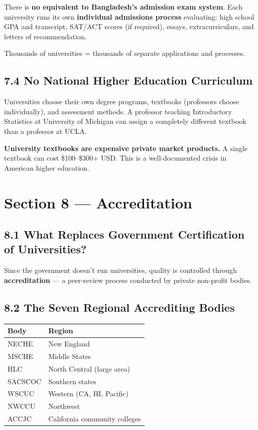 	There is \textbf{no equivalent to Bangladesh's admission exam system}. Each university runs its own \textbf{individual admissions process} evaluating: high school GPA and transcript, SAT/ACT scores (if required), essays, extracurriculars, and letters of recommendation.

	Thousands of universities = thousands of separate applications and processes.

	\subsection{7.4 No National Higher Education Curriculum}

	Universities choose their own degree programs, textbooks (professors choose individually), and assessment methods. A professor teaching Introductory Statistics at University of Michigan can assign a completely different textbook than a professor at UCLA.

	\textbf{University textbooks are expensive private market products.} A single textbook can cost \$100--\$300+ USD. This is a well-documented crisis in American higher education.

	\section{Section 8 --- Accreditation}

	\subsection{8.1 What Replaces Government Certification of Universities?}

	Since the government doesn't run universities, quality is controlled through \textbf{accreditation} --- a peer-review process conducted by private non-profit bodies.

	\subsection{8.2 The Seven Regional Accrediting Bodies}


\begin{center}\small
	\begin{tabularx}{0.85\textwidth}{@{} l X @{}}
		\toprule
		\textbf{Body} & \textbf{Region}               \\
		\midrule
		NECHE         & New England                   \\
		MSCHE         & Middle States                 \\
		HLC           & North Central (large area)    \\
		SACSCOC       & Southern states               \\
		WSCUC         & Western (CA, HI, Pacific)     \\
		NWCCU         & Northwest                     \\
		ACCJC         & California community colleges \\
		\bottomrule
	\end{tabularx}
\end{center}


